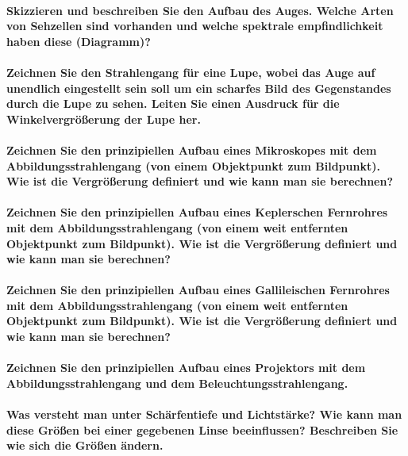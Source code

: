 \documentclass[a4paper, 11pt, parskip=half]{scrartcl}
\begin{document}
\paragraph{Skizzieren und beschreiben Sie den Aufbau des Auges. Welche Arten von Sehzellen sind
vorhanden und welche spektrale empfindlichkeit haben diese (Diagramm)?}

\paragraph{Zeichnen Sie den Strahlengang für eine Lupe, wobei das Auge auf unendlich eingestellt
sein soll um ein scharfes Bild des Gegenstandes durch die Lupe zu sehen. Leiten Sie einen Ausdruck
für die Winkelvergrößerung der Lupe her.}

\paragraph{Zeichnen Sie den prinzipiellen Aufbau eines Mikroskopes mit dem Abbildungsstrahlengang
(von einem Objektpunkt zum Bildpunkt). Wie ist die Vergrößerung definiert und wie kann man sie
berechnen?}

\paragraph{Zeichnen Sie den prinzipiellen Aufbau eines Keplerschen Fernrohres mit dem
Abbildungsstrahlengang (von einem weit entfernten Objektpunkt zum Bildpunkt). Wie ist die
Vergrößerung definiert und wie kann man sie berechnen?}

\paragraph{Zeichnen Sie den prinzipiellen Aufbau eines Gallileischen Fernrohres mit dem
Abbildungsstrahlengang (von einem weit entfernten Objektpunkt zum Bildpunkt). Wie ist die
Vergrößerung definiert und wie kann man sie berechnen?}

\paragraph{Zeichnen Sie den prinzipiellen Aufbau eines Projektors mit dem Abbildungsstrahlengang
und dem Beleuchtungsstrahlengang.}

\paragraph{Was versteht man unter Schärfentiefe und Lichtstärke? Wie kann man diese Größen bei
einer gegebenen Linse beeinflussen? Beschreiben Sie wie sich die Größen ändern.}
\end{document}
